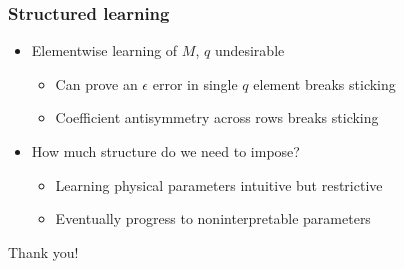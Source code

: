 \documentclass{beamer}
\begin{document}
\begin{frame}
    \frametitle{Structured learning}
    \begin{itemize}
        \item Elementwise learning of $M$, $q$ undesirable
        \begin{itemize}
            \item Can prove an $\epsilon$ error in single $q$ element breaks sticking
            \item Coefficient antisymmetry across rows breaks sticking
        \end{itemize}
        \item How much structure do we need to impose?
        \begin{itemize}
            \item Learning physical parameters intuitive but restrictive
            \item Eventually progress to noninterpretable parameters 
        \end{itemize}
    \end{itemize}
\end{frame}

\begin{frame}[plain,c]
    \begin{center}
        \Huge Thank you! 
    \end{center}
\end{frame}
\end{document}
